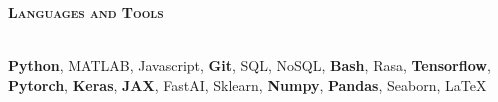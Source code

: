\documentclass[10pt]{article}
\renewcommand{\section}[1]{
\bigskip
  \begin{Large}
  {\textsc{\textbf{#1}}}
  \end{Large}
  \hrulefill
  \medskip
  \\
}
\newenvironment{lonemidlist}[1][\enskip\textbullet]%
        {\begin{itemize}[#1,leftmargin=*,parsep=0pt,itemsep=4pt,topsep=0pt,partopsep=0pt]}
        {\end{itemize}}
\begin{document}
\section{Languages and Tools}
\textbf{Python}, MATLAB, Javascript, \textbf{Git}, SQL, NoSQL, \textbf{Bash}, Rasa, \textbf{Tensorflow}, \textbf{Pytorch}, \textbf{Keras}, \textbf{JAX}, FastAI, Sklearn, \textbf{Numpy}, \textbf{Pandas}, Seaborn, LaTeX
\vspace{1.0mm}


\end{document}
